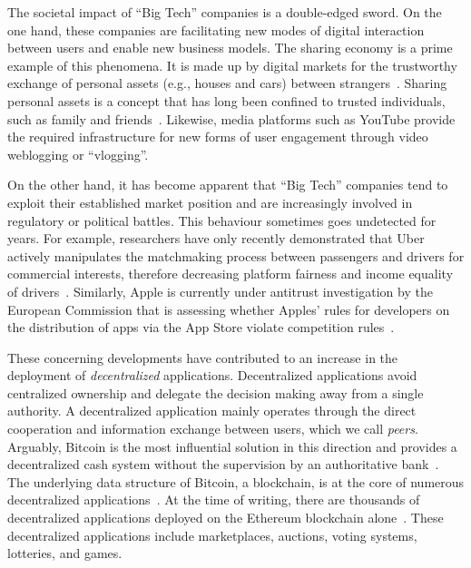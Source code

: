 The societal impact of \enquote{Big Tech} companies is a double-edged sword.
On the one hand, these companies are facilitating new modes of digital interaction between users and enable new business models.
The sharing economy is a prime example of this phenomena.
It is made up by digital markets for the trustworthy exchange of personal assets (e.g., houses and cars) between strangers~\cite{schor2016debating}.
Sharing personal assets is a concept that has long been confined to trusted individuals, such as family and friends~\cite{frenken2019putting}.
Likewise, media platforms such as YouTube provide the required infrastructure for new forms of user engagement through video weblogging or \enquote{vlogging}.

On the other hand, it has become apparent that \enquote{Big Tech} companies tend to exploit their established market position and are increasingly involved in regulatory or political battles.
This behaviour sometimes goes undetected for years.
For example, researchers have only recently demonstrated that Uber actively manipulates the matchmaking process between passengers and drivers for commercial interests, therefore decreasing platform fairness and income equality of drivers~\cite{bokanyi2019ride}.
Similarly, Apple is currently under antitrust investigation by the European Commission that is assessing whether Apples' rules for developers on the distribution of apps via the App Store violate competition rules~\cite{kotapati2020antitrust}.

These concerning developments have contributed to an increase in the deployment of \emph{decentralized} applications.
Decentralized applications avoid centralized ownership and delegate the decision making away from a single authority.
A decentralized application mainly operates through the direct cooperation and information exchange between users, which we call \emph{peers}.
Arguably, Bitcoin is the most influential solution in this direction and provides a decentralized cash system without the supervision by an authoritative bank~\cite{nakamoto2008bitcoin}.
The underlying data structure of Bitcoin, a blockchain, is at the core of numerous decentralized applications~\cite{bashir2018mastering}.
At the time of writing, there are thousands of decentralized applications deployed on the Ethereum blockchain alone~\cite{wood2014ethereum}.
These decentralized applications include marketplaces, auctions, voting systems, lotteries, and games.

